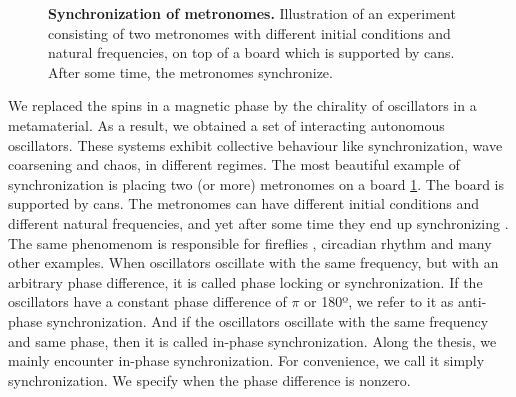 \documentclass[11pt, a4paper]{article} %
\begin{document}
\begin{figure}
\caption{\textbf{Synchronization of metronomes.}
Illustration of an experiment consisting of two metronomes with different initial conditions and natural frequencies, on top of 
a board which is supported by cans. After some time, the metronomes synchronize.}
\label{fig:metronomes}
\end{figure}

We replaced the spins in a magnetic phase by the chirality of oscillators in a metamaterial. 
As a result, we obtained a set of interacting autonomous oscillators. %
These systems exhibit collective behaviour like synchronization, wave coarsening \cite{veenstra} 
and chaos, in different regimes. %
The most beautiful example of synchronization is placing two (or more) metronomes on a board \ref{fig:metronomes}. 
The board is supported by cans. 
The metronomes can have different initial conditions and different natural frequencies, and yet after some time 
they end up synchronizing \cite{PantaleoneSync}. 
The same phenomenom is responsible for fireflies \cite{fireflies}, circadian rhythm \cite{circadian} and many other examples. 
When oscillators oscillate with the same frequency, but with an arbitrary phase difference, it is called phase locking or synchronization. 
If the oscillators have a constant phase difference of $\pi$ or 180º, we refer to it as anti-phase synchronization. 
And if the oscillators oscillate with the same frequency and same phase, then it is called in-phase synchronization. 
Along the thesis, we mainly encounter in-phase synchronization. For convenience, we call it simply synchronization.
We specify when the phase difference is nonzero. 
\end{document}
